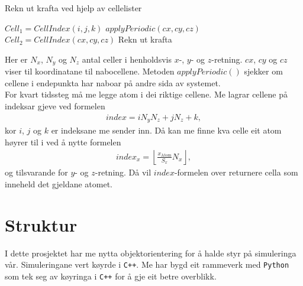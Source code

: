 \documentclass[12pt, a4paper]{article}
\theoremstyle{definition} \newtheorem*{definition}{Teorem}
\begin{document}
        \begin{algorithm}[H]
            \caption{Rekn ut krafta ved hjelp av cellelister}
            \label{Cellelister}
            \begin{algorithmic}[1]
                            \State $Cell_{1} = CellIndex(i, j, k)$
                                        \State $applyPeriodic(cx, cy, cz)$
                                        \State $Cell_{2} = CellIndex(cx, cy, cz)$
                                                \State Rekn ut krafta
                                            \EndFor
                                        \EndFor
                                    \EndFor
                                \EndFor
                            \EndFor
                        \EndFor
                    \EndFor
                \EndFor
            \end{algorithmic}
        \end{algorithm}
        Her er $N_x$, $N_y$ og $N_z$ antal celler i henholdsvis $x$-, $y$- og $z$-retning. $cx$, $cy$ og $cz$ viser til koordinatane til nabocellene. Metoden $applyPeriodic()$ 
        sjekker om cellene i endepunkta har naboar på andre sida av systemet. \\
        For kvart tidssteg må me legge atom i dei riktige cellene. Me lagrar cellene på indeksar gjeve ved formelen
        \begin{align*}
            index = iN_yN_z + jN_z + k,
        \end{align*}
        kor $i$, $j$ og $k$ er indeksane me sender inn. Då kan me finne kva celle eit atom høyrer til i ved å nytte formelen
        \begin{align*}
            index_x = \left \lfloor \frac{x_{\text{Atom}}}{S_{x}} N_{x}\right \rfloor,
        \end{align*}
        og tilsvarande for $y$- og $z$-retning. Då vil $index$-formelen over returnere cella som inneheld det gjeldane atomet.

\newpage
\section*{Struktur}
    I dette prosjektet har me nytta objektorientering for å halde styr på simuleringa vår. Simuleringane vert køyrde i \verb!C++!. Me har bygd eit rammeverk med 
    \verb!Python! som tek seg av køyringa i \verb!C++! for å gje eit betre overblikk.
\end{document}
